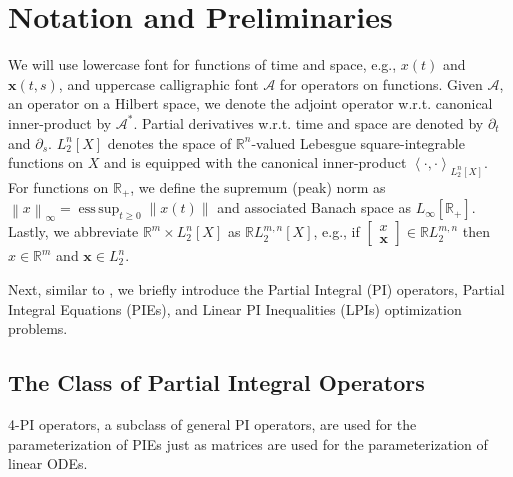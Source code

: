 \documentclass[letterpaper, 10 pt, conference]{ieeeconf}
\newcommand{\R}{\mathbb{R}}
\newcommand{\ip}[2]{\left\langle #1,#2\right\rangle}
\DeclareMathOperator*{\esssup}{ess\,sup}
\newcommand{\mcl}[1]{\mathcal{#1}}
\newcommand{\mbf}[1]{\mathbf{#1}}
\newcommand{\norm}[1]{\left\lVert #1 \right\rVert}
\theoremstyle{definition}
\begin{document}
\section{Notation and Preliminaries}
We will use lowercase font for functions of time and space, e.g., $x(t)$ and $\mbf x(t,s)$, and uppercase calligraphic font $\mcl A$ for operators on functions. Given $\mcl A$, an operator on a Hilbert space, we denote the adjoint operator w.r.t. canonical inner-product by $\mcl A^*$.
Partial derivatives w.r.t. time and space are denoted by $\partial_t$ and $\partial_s$.
$L_2^n[X]$ denotes the space of $\R^n$-valued Lebesgue square-integrable functions on $X$ and is equipped with the canonical inner-product $\ip{\cdot}{\cdot}_{L_2^n[X]}$. For functions on $\R_+$, we define the supremum (peak) norm as $\norm{x}_\infty = \esssup_{t\ge 0} \norm{x(t)}$ and associated Banach space as $L_\infty[\R_+]$. %
Lastly, we abbreviate $\R^m\times L_2^n[X]$ as $\R L_2^{m,n}[X]$, e.g., if $\begin{bmatrix}
    x \\ \mathbf{x}
\end{bmatrix} \in  \mathbb{R}L_2^{m,n}$ then $x \in \mathbb{R}^m$ and $\mathbf{x}\in L_2^n$.

Next, similar to \cite{shivakumar_dual_2024}, we briefly introduce the Partial Integral (PI) operators, Partial Integral Equations (PIEs), and Linear PI Inequalities (LPIs) optimization problems.

\subsection{The Class of Partial Integral Operators}

4-PI operators, a subclass of general PI operators, are used for the parameterization of PIEs just as matrices are used for the parameterization of linear ODEs. 
\end{document}
